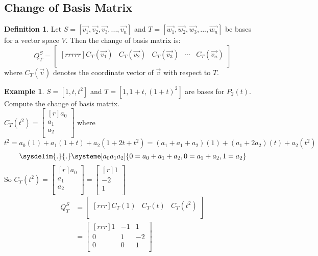 \documentclass{report}
\theoremstyle{plain}
\theoremstyle{definition}
\newtheorem*{ex}{Example}
\newtheorem*{defn}{Definition}
\theoremstyle{plain}
\begin{document}
\subsection{Change of Basis Matrix}
\begin{defn}
Let $S=[\vec{v_1},\vec{v_2},\vec{v_3},...,\vec{v_n}]$ and $T=[\vec{w_1},\vec{w_2},\vec{w_3},...,\vec{w_n}]$ be bases for a vector space $V$. Then the change of basis matrix is:
\[ Q_T^S = \begin{bmatrix}[rrrrr]C_T(\vec{v_1})&C_T(\vec{v_2})&C_T(\vec{v_3})& \cdots& C_T(\vec{v_n})\\\end{bmatrix} \]
where $C_T(\vec{v})$ denotes the coordinate vector of $\vec{v}$ with respect to $T$. 
\end{defn}
\begin{ex}
$S=[1,t,t^2]$ and $T=[1,1+t,(1+t)^2]$ are bases for $P_2(t)$. Compute the change of basis matrix.\\
$C_T(t^2) = \begin{bmatrix}[r]a_0\\a_1\\a_2\\\end{bmatrix}$ where $t^2 = a_0(1)+a_1(1+t)+a_2(1+2t+t^2) = (a_1+a_1+a_2)(1)+(a_1+2a_2)(t)+a_2(t^2)$
\[ \sysdelim{.}{.}\systeme[a_0a_1a_2]{0=a_0+a_1+a_2,0=a_1+a_2,1=a_2} \]
So $C_T(t^2) = \begin{bmatrix}[r]a_0\\a_1\\a_2\\\end{bmatrix} = \begin{bmatrix}[r]1\\-2\\1\\\end{bmatrix}$
\begin{align*}
Q_T^S &= \begin{bmatrix}[rrr]C_T(1) & C_T(t) & C_T(t^2)\\\end{bmatrix}\\
&=\begin{bmatrix}[rrr]1&-1&1\\0&1&-2\\0&0&1\\\end{bmatrix}
\end{align*} 
\end{ex}
\end{document}
